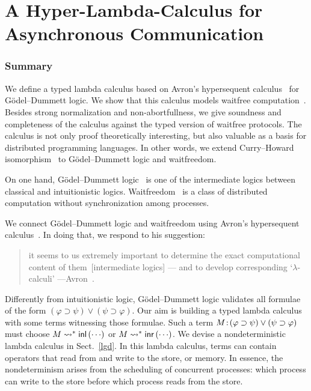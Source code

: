 \renewcommand{\comodL}{\comod cd}
\renewcommand{\comodR}{\comod dc}

\chapter{A Hyper-Lambda-Calculus for Asynchronous Communication}
\label{ch:lambda}

\subsection{Summary}

We define a typed lambda calculus based on Avron's hypersequent
calculus~\citep{avron91} for G\"odel--Dummett logic.
We show that this calculus models
waitfree computation~\citep{Herlihy88,Saks:1993vq}.
Besides strong normalization and non-abortfullness,
we give soundness and completeness of
the calculus against the typed version of waitfree protocols.
The calculus is not only proof theoretically interesting,
but also valuable as a basis for distributed programming languages.
In other words, we extend
Curry--Howard isomorphism~\cite{curryhoward} to G\"odel--Dummett logic and
waitfreedom.

On one hand, G\"odel--Dummett logic~\cite{dummett59}
is one of the intermediate logics
between classical and intuitionistic logics.
Waitfreedom~\cite{Herlihy88,Saks:1993vq} is a class of distributed
computation without synchronization among processes.

We connect G\"odel--Dummett logic and waitfreedom using
Avron's hypersequent calculus~\cite{avron91}.
In doing that, we respond to his suggestion:
\begin{quote}
it seems to us extremely important to determine the exact
       computational content of them~[intermediate logics] ---
       and {to develop corresponding `$\lambda$-calculi'}
       ---Avron~\cite{avron91}.
\end{quote}
Differently from intuitionistic logic, G\"odel--Dummett logic validates
all formulae of the form
 $(\varphi\supset\psi)\vee(\psi\supset\varphi)$.
Our aim is building a typed lambda calculus
with some terms witnessing those formulae.
Such a term
${M} \mathord{\colon\kern -2pt}{(\varphi\supset\psi)\vee(\psi\supset\varphi)}$ must choose
$M\rightsquigarrow^\ast \mathsf{inl}\left({\cdots}\right)$ or $M\rightsquigarrow^\ast \mathsf{inr}\left({\cdots}\right)$.
We devise a nondeterministic lambda calculus in Sect.~\ref{lgd}.
In this lambda calculus, terms can contain operators that read from and
write to the store, or memory.
In essence, the nondeterminism arises from the scheduling of concurrent
processes: which process can write to the store before which process
reads from the store.

